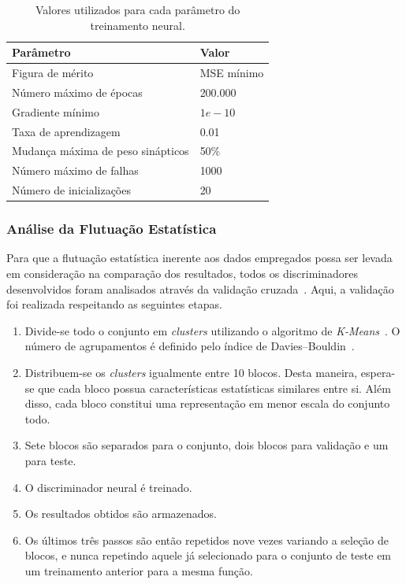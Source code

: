 \begin{table}[htbp!]\footnotesize
  \centering
  \tabcolsep=0.08cm
  \begin{tabular}{ m{7cm} m{3cm} }
      Parâmetro & Valor \\
      \midrule
      Figura de mérito           & MSE mínimo \\
      Número máximo de épocas    & 200.000 \\
      Gradiente mínimo           & $1e-10$ \\
      Taxa de aprendizagem       & 0.01 \\
      Mudança máxima de peso sinápticos    & 50\% \\
      Número máximo de falhas    & 1000 \\
      Número de inicializações   & 20 \\
      \bottomrule
  \end{tabular}
  \caption{Valores utilizados para cada parâmetro do treinamento neural.}
  \label{table:nnparameters}

\end{table}

\subsubsection{Análise da Flutuação Estatística}

Para que a flutuação estatística inerente aos dados empregados possa ser levada
em consideração na comparação dos resultados, todos os discriminadores
desenvolvidos foram analisados através da validação cruzada~\cite{HAYKIN2008}.
Aqui, a validação foi realizada respeitando as seguintes etapas.

\begin{enumerate}
    \item Divide-se todo o conjunto em \emph{clusters} utilizando o algoritmo de
    \emph{K-Means}~\cite{HARTIGAN1979}. O número de agrupamentos é definido pelo
    índice de Davies--Bouldin~\cite{DAVIES1979}.
    \item Distribuem-se os \emph{clusters} igualmente entre 10 blocos. Desta
    maneira, espera-se que cada bloco possua características estatísticas
    similares entre si. Além disso, cada bloco constitui uma representação em
    menor escala do conjunto todo.
    \item Sete blocos são separados para o conjunto, dois blocos para validação
    e um para teste.
    \item O discriminador neural é treinado.
    \item Os resultados obtidos são armazenados.
    \item Os últimos três passos são então repetidos nove vezes variando a
    seleção de blocos, e nunca repetindo aquele já selecionado para o conjunto
    de teste em um treinamento anterior para a mesma função.
\end{enumerate}


